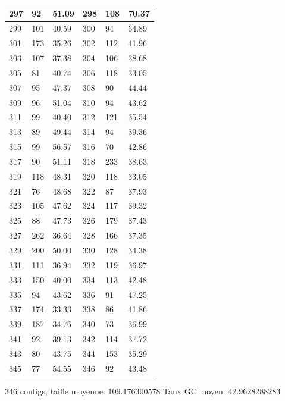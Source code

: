 \documentclass[10.9pt]{article} %
\begin{document}
{\begin{longtable}{|p{2cm}|p{2cm}|p{2cm}|p{2cm}|p{2cm}|p{2cm}|}
\hline
297 & 92& 51.09 & 298 & 108& 70.37\\
\hline
299 & 101& 40.59 & 300 & 94& 64.89\\
\hline
301 & 173& 35.26 & 302 & 112& 41.96\\
\hline
303 & 107& 37.38 & 304 & 106& 38.68\\
\hline
305 & 81& 40.74 & 306 & 118& 33.05\\
\hline
307 & 95& 47.37 & 308 & 90& 44.44\\
\hline
309 & 96& 51.04 & 310 & 94& 43.62\\
\hline
311 & 99& 40.40 & 312 & 121& 35.54\\
\hline
313 & 89& 49.44 & 314 & 94& 39.36\\
\hline
315 & 99& 56.57 & 316 & 70& 42.86\\
\hline
317 & 90& 51.11 & 318 & 233& 38.63\\
\hline
319 & 118& 48.31 & 320 & 118& 33.05\\
\hline
321 & 76& 48.68 & 322 & 87& 37.93\\
\hline
323 & 105& 47.62 & 324 & 117& 39.32\\
\hline
325 & 88& 47.73 & 326 & 179& 37.43\\
\hline
327 & 262& 36.64 & 328 & 166& 37.35\\
\hline
329 & 200& 50.00 & 330 & 128& 34.38\\
\hline
331 & 111& 36.94 & 332 & 119& 36.97\\
\hline
333 & 150& 40.00 & 334 & 113& 42.48\\
\hline
335 & 94& 43.62 & 336 & 91& 47.25\\
\hline
337 & 174& 33.33 & 338 & 86& 41.86\\
\hline
339 & 187& 34.76 & 340 & 73& 36.99\\
\hline
341 & 92& 39.13 & 342 & 114& 37.72\\
\hline
343 & 80& 43.75 & 344 & 153& 35.29\\
\hline
345 & 77& 54.55 & 346 & 92& 43.48\\
\hline
\end{longtable}
}
346 contigs, taille moyenne: 109.176300578 Taux GC moyen: 42.9628288283
\end{document}
